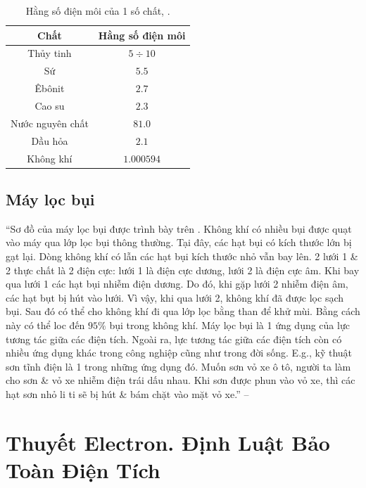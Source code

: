 \documentclass[oneside]{book}
\numberwithin{equation}{section}
\begin{document}
\begin{table}[H]
	\centering
	\begin{tabular}{|c|c|}
		\hline
		\textbf{Chất} & \textbf{Hằng số điện môi} \\
		\hline
		Thủy tinh & $5\div 10$ \\
		\hline
		Sứ & $5.5$ \\
		\hline
		Êbônit & $2.7$ \\
		\hline
		Cao su & $2.3$ \\
		\hline
		Nước nguyên chất & $81.0$ \\
		\hline
		Dầu hỏa & $2.1$ \\
		\hline
		Không khí & $1.000594$ \\
		\hline
	\end{tabular}
	\caption{Hằng số điện môi của 1 số chất, \cite[Bảng 1.1, p. 8]{SGK_Vat_Ly_11_nang_cao}.}
	\label{tab:hang so dien moi}
\end{table}

\subsection{Máy lọc bụi}
``Sơ đồ của máy lọc bụi được trình bày trên \cite[Hình 1.8: \textsf{Sơ đồ máy lọc bụi}, p. 9]{SGK_Vat_Ly_11_nang_cao}. Không khí có nhiều bụi được quạt vào máy qua lớp lọc bụi thông thường. Tại đây, các hạt bụi có kích thước lớn bị gạt lại. Dòng không khí có lẫn các hạt bụi kích thước nhỏ vẫn bay lên. 2 lưới 1 \& 2 thực chất là 2 điện cực: lưới 1 là điện cực dương, lưới 2 là điện cực âm. Khi bay qua lưới 1 các hạt bụi nhiễm điện dương. Do đó, khi gặp lưới 2 nhiễm điện âm, các hạt bụt bị hút vào lưới. Vì vậy, khi qua lưới 2, không khí đã được lọc sạch bụi. Sau đó có thể cho không khí đi qua lớp lọc bằng than để khử mùi. Bằng cách này có thể loc đến $95\%$ bụi trong không khí. Máy lọc bụi là 1 ứng dụng của lực tương tác giữa các điện tích. Ngoài ra, lực tương tác giữa các điện tích còn có nhiều ứng dụng khác trong công nghiệp cũng như trong đời sống. E.g., kỹ thuật sơn tĩnh điện là 1 trong những ứng dụng đó. Muốn sơn vỏ xe ô tô, người ta làm cho sơn \& vỏ xe nhiễm điện trái dấu nhau. Khi sơn được phun vào vỏ xe, thì các hạt sơn nhỏ li ti sẽ bị hút \& bám chặt vào mặt vỏ xe.'' -- \cite[p. 9]{SGK_Vat_Ly_11_nang_cao}


\section{Thuyết Electron. Định Luật Bảo Toàn Điện Tích}
\end{document}
